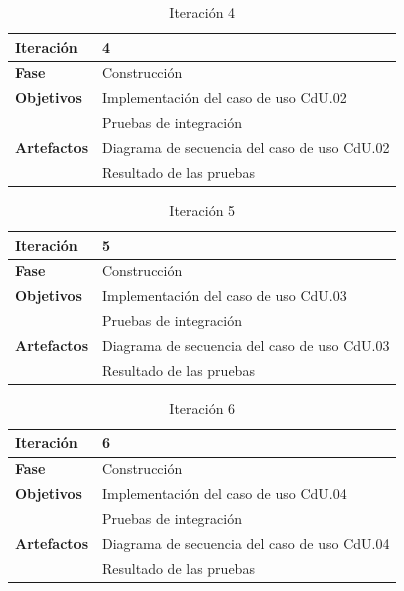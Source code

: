 \begin{table}[htb]
    \centering
    \caption{Iteración 4}
    \label{tab:resultados.planificacion.iter.4}
    \begin{tabular}[t]{| l || p{8cm} |}
        \hline
        \textbf{Iteración} & 4 \\ \hline
        \textbf{Fase} & Construcción \\ \hline
        \multirow{1}{*}{\textbf{Objetivos}}
        & Implementación del caso de uso CdU.02 \\ \cline{2-2}
        & Pruebas de integración \\ \hline
        \multirow{1}{*}{\textbf{Artefactos}}
        & Diagrama de secuencia del caso de uso CdU.02 \\ \cline{2-2}
        & Resultado de las pruebas \\
        \hline
    \end{tabular}
\end{table}

\begin{table}[htb]
    \centering
    \caption{Iteración 5}
    \label{tab:resultados.planificacion.iter.5}
    \begin{tabular}[t]{| l || p{8cm} |}
        \hline
        \textbf{Iteración} & 5 \\ \hline
        \textbf{Fase} & Construcción \\ \hline
        \multirow{1}{*}{\textbf{Objetivos}}
        & Implementación del caso de uso CdU.03 \\ \cline{2-2}
        & Pruebas de integración \\ \hline
        \multirow{1}{*}{\textbf{Artefactos}}
        & Diagrama de secuencia del caso de uso CdU.03 \\ \cline{2-2}
        & Resultado de las pruebas \\
        \hline
    \end{tabular}
\end{table}

\begin{table}[htb]
    \centering
    \caption{Iteración 6}
    \label{tab:resultados.planificacion.iter.6}
    \begin{tabular}[t]{| l || p{8cm} |}
        \hline
        \textbf{Iteración} & 6 \\ \hline
        \textbf{Fase} & Construcción \\ \hline
        \multirow{1}{*}{\textbf{Objetivos}}
        & Implementación del caso de uso CdU.04 \\ \cline{2-2}
        & Pruebas de integración \\ \hline
        \multirow{1}{*}{\textbf{Artefactos}}
        & Diagrama de secuencia del caso de uso CdU.04 \\ \cline{2-2}
        & Resultado de las pruebas \\
        \hline
    \end{tabular}
\end{table}


